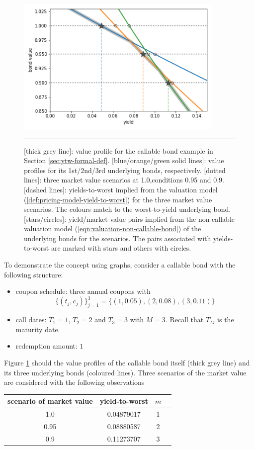 \documentclass[10pt,a4paper]{article}
\begin{document}
\begin{figure}[h!]
	\begin{center}
	\includegraphics[width=10cm]{pics/pv-ytw.png}
	\end{center}
	\caption{
		[thick grey line]: value profile for the callable bond example in Section \ref{sec:ytw-formal-def}. [blue/orange/green solid lines]: value profiles for its 1st/2nd/3rd underlying bonds, respectively. 
		[dotted lines]: three market value scenarios at 1.0,conditions 0.95 and 0.9.
		[dashed lines]: yields-to-worst implied from the valuation model  (\ref{def:pricing-model-yield-to-worst}) for the three market value scenarios. The colours match to the worst-to-yield underlying bond. [stars/circles]: yield/market-value pairs implied from the non-callable valuation model (\ref{eqn:valuation-non-callable-bond}) of the underlying bonds for the scenarios. The pairs associated with yields-to-worst are marked with stars and others with circles.}
	\label{fig:pv-ytw}	
	\hrule
\end{figure}

To demonstrate the concept using graphs, consider a callable bond with the following structure:
\begin{itemize}
	\item coupon schedule: three annual coupons with
	$$\{(t_j, c_j)\}_{j=1}^{3} = \{(1,0.05), (2,0.08), (3,0.11) \}$$
	\item call dates: $T_1 = 1$, $T_2 = 2$ and $T_3 = 3$ with $M=3$. Recall that $T_M$ is the maturity date. 
	\item redemption amount: $1$
\end{itemize}


Figure \ref{fig:pv-ytw} should the value profiles of the callable bond itself (thick grey line) and its three underlying bonds (coloured lines). Three scenarios of the market value are considered with the following observations
\begin{center}
	\begin{tabular}{cccc}
		\hline
		scenario of market value & yield-to-worst & $\bar{m}$ \\
		\hline
		1.0  & 0.04879017 & 1\\
		0.95  & 0.08880587 & 2\\
		0.9  & 0.11273707 & 3\\
		\hline
	\end{tabular}
\end{center}
\end{document}
